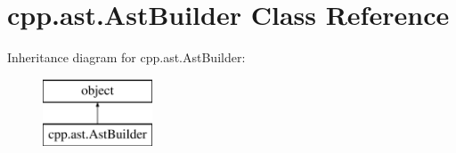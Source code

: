 \hypertarget{classcpp_1_1ast_1_1_ast_builder}{}\section{cpp.\+ast.\+Ast\+Builder Class Reference}
\label{classcpp_1_1ast_1_1_ast_builder}
Inheritance diagram for cpp.\+ast.\+Ast\+Builder\+:\begin{figure}[H]
\begin{center}
\leavevmode
\includegraphics[height=2.000000cm]{d9/dc3/classcpp_1_1ast_1_1_ast_builder}
\end{center}
\end{figure}
